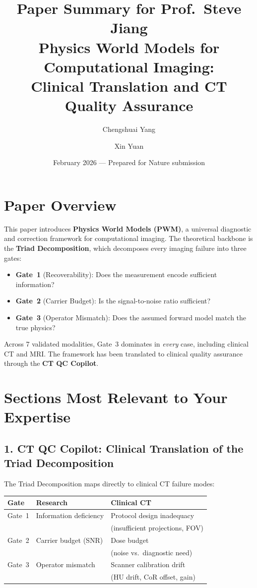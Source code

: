 \documentclass[11pt]{article}
\title{\textbf{Paper Summary for Prof.\ Steve Jiang}\\[4pt]
\large Physics World Models for Computational Imaging:\\
Clinical Translation and CT Quality Assurance}
\author{Chengshuai Yang \and Xin Yuan}
\date{February 2026 --- Prepared for Nature submission}
\begin{document}
\maketitle
\thispagestyle{empty}

\section*{Paper Overview}

This paper introduces \textbf{Physics World Models (PWM)}, a universal diagnostic and correction framework for computational imaging.  The theoretical backbone is the \textbf{Triad Decomposition}, which decomposes every imaging failure into three gates:

\begin{itemize}
  \item \textbf{Gate~1} (Recoverability): Does the measurement encode sufficient information?
  \item \textbf{Gate~2} (Carrier Budget): Is the signal-to-noise ratio sufficient?
  \item \textbf{Gate~3} (Operator Mismatch): Does the assumed forward model match the true physics?
\end{itemize}

Across 7 validated modalities, Gate~3 dominates in \emph{every} case, including clinical CT and MRI.  The framework has been translated to clinical quality assurance through the \textbf{CT QC Copilot}.

\section*{Sections Most Relevant to Your Expertise}

\subsection*{1. CT QC Copilot: Clinical Translation of the Triad Decomposition}

The Triad Decomposition maps directly to clinical CT failure modes:

\begin{center}
\begin{tabular}{lll}
\toprule
\textbf{Gate} & \textbf{Research} & \textbf{Clinical CT} \\
\midrule
Gate~1 & Information deficiency & Protocol design inadequacy \\
       &                        & (insufficient projections, FOV) \\
Gate~2 & Carrier budget (SNR)   & Dose budget \\
       &                        & (noise vs.\ diagnostic need) \\
Gate~3 & Operator mismatch      & Scanner calibration drift \\
       &                        & (HU drift, CoR offset, gain) \\
\bottomrule
\end{tabular}
\end{center}
\end{document}

